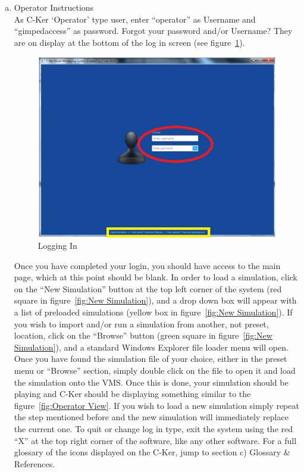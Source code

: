 \documentclass[12pt]{article}
\begin{document}
\begin{enumerate} [(a)]
\vspace*{0.2in}
\item Operator Instructions\\
As C-Ker ‘Operator’ type user, enter “operator” as Username and “gimpedaccess” as password. Forgot your password and/or Username? They are on display at the bottom of the log in screen (see figure~\ref{fig:Logging In}).
\begin{figure}[h!]
    \centering
    \includegraphics[scale=1]{manu1}
    \caption{Logging In}
    \label{fig:Logging In}
\end{figure}\par
Once you have completed your login, you should have access to the main page, which at this point should be blank. In order to load a simulation, click on the “New Simulation” button at the top left corner of the system (red square in figure~\ref{fig:New Simulation}), and a drop down box will appear with a list of preloaded simulations (yellow box in figure~\ref{fig:New Simulation}). If you wish to import and/or run a simulation from another, not preset, location, click on the “Browse” button (green square in figure~\ref{fig:New Simulation}), and a standard Windows Explorer file loader menu will open. Once you have found the simulation file of your choice, either in the preset menu or “Browse” section, simply double click on the file to open it and load the simulation onto the VMS. Once this is done, your simulation should be playing and C-Ker should be displaying something similar to the figure~\ref{fig:Operator View}. If you wish to load a new simulation simply repeat the step mentioned before and the new simulation will immediately replace the current one. To quit or change log in type, exit the system using the red “X” at the top right corner of the software, like any other software. For a full glossary of the icons displayed on the C-Ker, jump to section c) Glossary \& References.

\end{enumerate}
\end{document}
